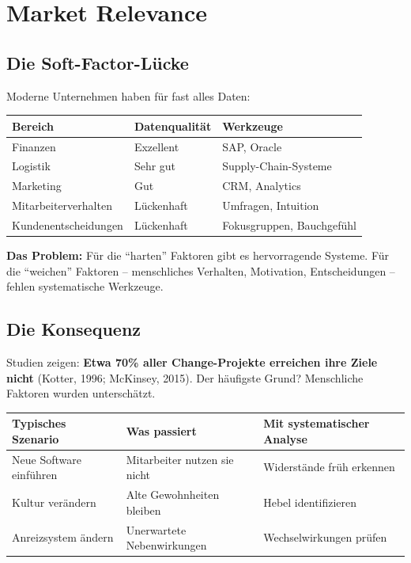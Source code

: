 \documentclass[11pt,a4paper]{article}
\begin{document}
\newpage


\section{Market Relevance}

\subsection{Die Soft-Factor-Lücke}

Moderne Unternehmen haben für fast alles Daten:

\begin{table}[h]
\centering
\begin{tabular}{@{}L{4cm}L{4cm}L{5cm}@{}}
\toprule
\textbf{Bereich} & \textbf{Datenqualität} & \textbf{Werkzeuge} \\
\midrule
Finanzen & Exzellent & SAP, Oracle \\
Logistik & Sehr gut & Supply-Chain-Systeme \\
Marketing & Gut & CRM, Analytics \\
Mitarbeiterverhalten & Lückenhaft & Umfragen, Intuition \\
Kundenentscheidungen & Lückenhaft & Fokusgruppen, Bauchgefühl \\
\bottomrule
\end{tabular}
\end{table}

\textbf{Das Problem:} Für die ``harten'' Faktoren gibt es hervorragende Systeme. Für die ``weichen'' Faktoren -- menschliches Verhalten, Motivation, Entscheidungen -- fehlen systematische Werkzeuge.

\subsection{Die Konsequenz}

Studien zeigen: \textbf{Etwa 70\% aller Change-Projekte erreichen ihre Ziele nicht} (Kotter, 1996; McKinsey, 2015). Der häufigste Grund? Menschliche Faktoren wurden unterschätzt.

\begin{table}[h]
\centering
\begin{tabular}{@{}L{4cm}L{4cm}L{5cm}@{}}
\toprule
\textbf{Typisches Szenario} & \textbf{Was passiert} & \textbf{Mit systematischer Analyse} \\
\midrule
Neue Software einführen & Mitarbeiter nutzen sie nicht & Widerstände früh erkennen \\
Kultur verändern & Alte Gewohnheiten bleiben & Hebel identifizieren \\
Anreizsystem ändern & Unerwartete Nebenwirkungen & Wechselwirkungen prüfen \\
\bottomrule
\end{tabular}
\end{table}
\end{document}
